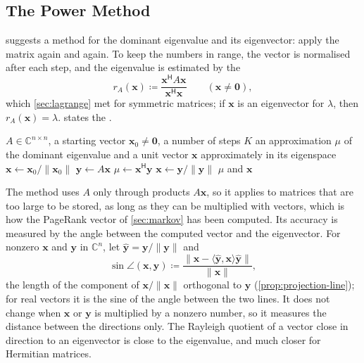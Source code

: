 \subsection{The Power Method}

 suggests a method for the dominant eigenvalue and its eigenvector: apply the matrix again and again. To keep the numbers in range, the vector is normalised after each step, and the eigenvalue is estimated by the 
\[
r_A(\mathbf x)\coloneqq\frac{\mathbf x^{\mathsf H}A\mathbf x}{\mathbf x^{\mathsf H}\mathbf x}\qquad(\mathbf x\ne\mathbf 0),
\]
which \cref{sec:lagrange} met for symmetric matrices; if $\mathbf x$ is an eigenvector for $\lambda$, then $r_A(\mathbf x)=\lambda$.  states the .

\begin{algorithm}
\begin{algorithmic}[1]
\Require $A\in\mathbb C^{n\times n}$, a starting vector $\mathbf x_0\ne\mathbf 0$, a number of steps $K$
\Ensure an approximation $\mu$ of the dominant eigenvalue and a unit vector $\mathbf x$ approximately in its eigenspace
\State $\mathbf x\gets\mathbf x_0/\|\mathbf x_0\|$
  \State $\mathbf y\gets A\mathbf x$ 
  \State $\mu\gets\mathbf x^{\mathsf H}\mathbf y$ 
  \State $\mathbf x\gets\mathbf y/\|\mathbf y\|$
\EndFor
\State \Return $\mu$ and $\mathbf x$
\end{algorithmic}
\caption{The power method (\cref{thm:power-method}). Each step costs one product of $A$ with a vector, $2n^2-n$ operations for a full real matrix, and about $5n$ further operations; in practice the loop stops when $\mu$ changes little. If $\mathbf y=\mathbf 0$ occurs, $\mathbf x$ is an eigenvector for $0$.}
\label{alg:power-method}
\end{algorithm}

The method uses $A$ only through products $A\mathbf x$, so it applies to matrices that are too large to be stored, as long as they can be multiplied with vectors, which is how the PageRank vector of \cref{sec:markov} has been computed. Its accuracy is measured by the angle between the computed vector and the eigenvector. For nonzero $\mathbf x$ and $\mathbf y$ in $\mathbb C^n$, let $\hat{\mathbf y}=\mathbf y/\|\mathbf y\|$ and
\[
\sin\angle(\mathbf x,\mathbf y)\coloneqq\frac{\|\mathbf x-\langle\hat{\mathbf y},\mathbf x\rangle\hat{\mathbf y}\|}{\|\mathbf x\|},
\]
the length of the component of $\mathbf x/\|\mathbf x\|$ orthogonal to $\mathbf y$ (\cref{prop:projection-line}); for real vectors it is the sine of the angle between the two lines. It does not change when $\mathbf x$ or $\mathbf y$ is multiplied by a nonzero number, so it measures the distance between the directions only. The Rayleigh quotient of a vector close in direction to an eigenvector is close to the eigenvalue, and much closer for Hermitian matrices.

